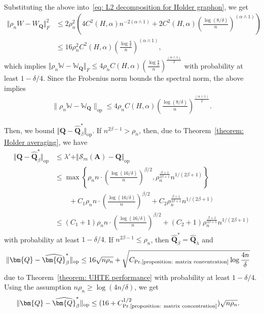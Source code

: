 \documentclass[11pt]{article}
\newcommand{\op}{\mathrm{op}}
\newcommand{\red}[1]{\textcolor{red}{#1}}
\newcommand{\bA}{\bm{A}}
\newcommand{\bQ}{\bm{Q}}
\newcommand{\bQhat}{\widehat{\bm{Q}}}
\newcommand{\opnorm}[1]{\|#1\|_{\mathrm{op}}}
\newcommand{\bbW}{\mathbb{W}}
\newcommand{\constantBandeira}{C_{\text{Pr.\ref{proposition: matrix concentration}}}}
\newcommand{\<}{\langle}
\renewcommand{\>}{\rangle}
\newcommand{\cS}{\mathcal{S}}
\theoremstyle{plain}
\theoremstyle{definition}
\theoremstyle{remark}
\begin{document}
{\begin{align*}
\end{align*}
Substituting the above into~\eqref{eq: L2 decomposition for Holder graphon}, we get
\begin{align*}
    \Vert \rho_nW - W_{\bQ} \Vert_{F}^2 & \le 2\rho_n^2 \left(4 C^2(H, \alpha) n^{-2 (\alpha \wedge 1)} + 2 C^2(H, \alpha) \left ( \frac{\log (8/\delta)}{n} \right )^{(\alpha \wedge 1)}\right)  \\
    & \le 16\rho_n^2 C^2(H, \alpha) \left ( \frac{\log \frac{8}{\delta}}{n} \right )^{(\alpha \wedge 1)},
\end{align*}
which implies
 $   \Vert \rho_n\bbW - \bbW_{\bQ} \Vert_{F} \leq4\rho_n C(H, \alpha) \left ( \frac{\log \frac{8}{\delta}}{n} \right )^{\frac{(\alpha \wedge 1)}{2}}$
with probability at least $1 - \delta/4$. Since the Frobenius norm bounds the spectral norm, the above implies
\begin{align}
	\opnorm{\rho_n \bbW - \bbW_{\bQ}} \le 4 \rho_n C(H, \alpha) \left ( \frac{\log (8/\delta)}{n} \right )^{\frac{(\alpha \wedge 1)}{2}}. \label{eq: holder matrix of connection probabilities difference}
\end{align}

Then, we bound $\Vert \bQ - \bQhat^*_{\beta}\Vert_{\op}$. If $n^{2 \beta - 1} > \rho_n$, then, due to Theorem~\ref{theorem: Holder averaging}, we have
\begin{align*}
    \Vert \bQ - \bQhat^*_{\beta} \Vert_{\op} & \le \lambda' + \Vert \cS_m(\bA) - \bQ \Vert_{\op} \\
    & \le \max \left \{\rho_n n \cdot \left (\frac{\log (16/\delta)}{n} \right )^{\beta/2}, \rho_n^{\frac{\beta + 1}{2 \beta + 1}} n^{1/(2 \beta + 1)} \right \} \\
    & \qquad +  C_1 \rho_n n \cdot \left ( \frac{\log(16/\delta)}{n} \right )^{\beta/2}  + C_2\rho_n^{\frac{\beta + 1}{2 \beta + 1}} n^{1/(2 \beta + 1)} \\
    & \le (C_1 + 1) \rho_n n \cdot \left ( \frac{\log(16/\delta)}{n} \right )^{\beta/2}  + (C_2 + 1)\rho_n^{\frac{\beta + 1}{2 \beta + 1}} n^{1/(2 \beta + 1)}
\end{align*}
with probability at least $1 - \delta/4$. 
If $n^{2 \beta - 1} \le \rho_n$, then $\bQhat^*_{\beta} = \widehat{\bQ}_{\lambda}$ and
\begin{align*}
    \Vert \bQ - \bQhat^*_{\beta} \Vert_{\op} & \le 16 \sqrt{n \rho_n} + \sqrt{\constantBandeira \log \frac{4n}{\delta}} 
\end{align*}
due to Theorem~\ref{theorem: UHTE performance} with probability at least $1 - \delta/4$. Using the assumption $n \rho_n \ge \log(4n/\delta)$, we get
\begin{align*}
    \Vert \bQ - \bQhat^*_{\beta} \Vert_{\op} & \le (16 + \constantBandeira^{1/2}) \sqrt{ n \rho_n}.
\end{align*}

}
\end{document}
